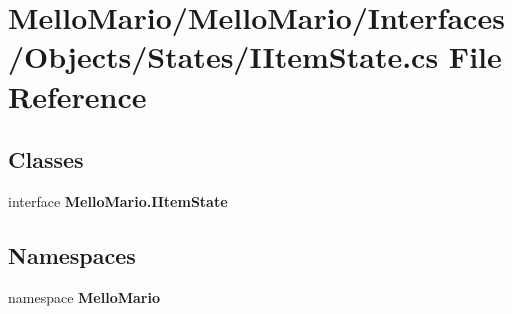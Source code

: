 \section{Mello\+Mario/\+Mello\+Mario/\+Interfaces/\+Objects/\+States/\+I\+Item\+State.cs File Reference}
\label{IItemState_8cs}
\subsection*{Classes}
\begin{DoxyCompactItemize}
\item 
interface \textbf{ Mello\+Mario.\+I\+Item\+State}
\end{DoxyCompactItemize}
\subsection*{Namespaces}
\begin{DoxyCompactItemize}
\item 
namespace \textbf{ Mello\+Mario}
\end{DoxyCompactItemize}
